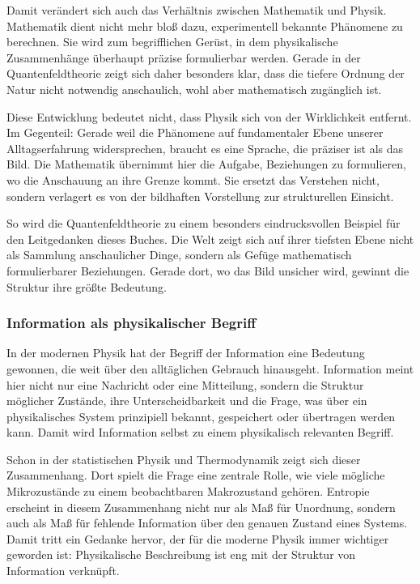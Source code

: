 Damit verändert sich auch das Verhältnis zwischen Mathematik und Physik. Mathematik dient nicht mehr bloß dazu, experimentell bekannte Phänomene zu berechnen. Sie wird zum begrifflichen Gerüst, in dem physikalische Zusammenhänge überhaupt präzise formulierbar werden. Gerade in der Quantenfeldtheorie zeigt sich daher besonders klar, dass die tiefere Ordnung der Natur nicht notwendig anschaulich, wohl aber mathematisch zugänglich ist.

Diese Entwicklung bedeutet nicht, dass Physik sich von der Wirklichkeit entfernt. Im Gegenteil: Gerade weil die Phänomene auf fundamentaler Ebene unserer Alltagserfahrung widersprechen, braucht es eine Sprache, die präziser ist als das Bild. Die Mathematik übernimmt hier die Aufgabe, Beziehungen zu formulieren, wo die Anschauung an ihre Grenze kommt. Sie ersetzt das Verstehen nicht, sondern verlagert es von der bildhaften Vorstellung zur strukturellen Einsicht.

So wird die Quantenfeldtheorie zu einem besonders eindrucksvollen Beispiel für den Leitgedanken dieses Buches. Die Welt zeigt sich auf ihrer tiefsten Ebene nicht als Sammlung anschaulicher Dinge, sondern als Gefüge mathematisch formulierbarer Beziehungen. Gerade dort, wo das Bild unsicher wird, gewinnt die Struktur ihre größte Bedeutung.

\subsubsection{Information als physikalischer Begriff}

In der modernen Physik hat der Begriff der Information eine Bedeutung gewonnen, die weit über den alltäglichen Gebrauch hinausgeht. Information meint hier nicht nur eine Nachricht oder eine Mitteilung, sondern die Struktur möglicher Zustände, ihre Unterscheidbarkeit und die Frage, was über ein physikalisches System prinzipiell bekannt, gespeichert oder übertragen werden kann. Damit wird Information selbst zu einem physikalisch relevanten Begriff.

Schon in der statistischen Physik und Thermodynamik zeigt sich dieser Zusammenhang. Dort spielt die Frage eine zentrale Rolle, wie viele mögliche Mikrozustände zu einem beobachtbaren Makrozustand gehören. Entropie erscheint in diesem Zusammenhang nicht nur als Maß für Unordnung, sondern auch als Maß für fehlende Information über den genauen Zustand eines Systems. Damit tritt ein Gedanke hervor, der für die moderne Physik immer wichtiger geworden ist: Physikalische Beschreibung ist eng mit der Struktur von Information verknüpft.

